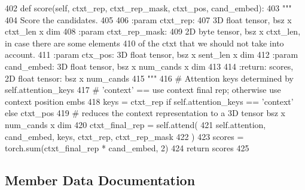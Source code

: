 \begin{DoxyCode}
402     \textcolor{keyword}{def }score(self, ctxt\_rep, ctxt\_rep\_mask, ctxt\_pos, cand\_embed):
403         \textcolor{stringliteral}{"""}
404 \textcolor{stringliteral}{        Score the candidates.}
405 \textcolor{stringliteral}{}
406 \textcolor{stringliteral}{        :param ctxt\_rep:}
407 \textcolor{stringliteral}{            3D float tensor, bsz x ctxt\_len x dim}
408 \textcolor{stringliteral}{        :param ctxt\_rep\_mask:}
409 \textcolor{stringliteral}{            2D byte tensor, bsz x ctxt\_len, in case there are some elements}
410 \textcolor{stringliteral}{            of the ctxt that we should not take into account.}
411 \textcolor{stringliteral}{        :param ctx\_pos: 3D float tensor, bsz x sent\_len x dim}
412 \textcolor{stringliteral}{        :param cand\_embed: 3D float tensor, bsz x num\_cands x dim}
413 \textcolor{stringliteral}{}
414 \textcolor{stringliteral}{        :return: scores, 2D float tensor: bsz x num\_cands}
415 \textcolor{stringliteral}{        """}
416         \textcolor{comment}{# Attention keys determined by self.attention\_keys}
417         \textcolor{comment}{# 'context' == use context final rep; otherwise use context position embs}
418         keys = ctxt\_rep \textcolor{keywordflow}{if} self.attention\_keys == \textcolor{stringliteral}{'context'} \textcolor{keywordflow}{else} ctxt\_pos
419         \textcolor{comment}{# reduces the context representation to a 3D tensor bsz x num\_cands x dim}
420         ctxt\_final\_rep = self.attend(
421             self.attention, cand\_embed, keys, ctxt\_rep, ctxt\_rep\_mask
422         )
423         scores = torch.sum(ctxt\_final\_rep * cand\_embed, 2)
424         \textcolor{keywordflow}{return} scores
425 
\end{DoxyCode}


\subsection{Member Data Documentation}
\mbox{\label{classparlai_1_1agents_1_1transformer_1_1polyencoder_1_1PolyEncoderModule_a8fab02ef33d1e1ee413e4bcbe25aa03b}} 
